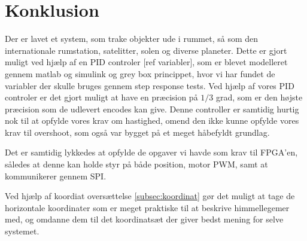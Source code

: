 \section{Konklusion}
Der er lavet et system, som trake objekter ude i rummet, så som den internationale rumstation, satelitter, solen og diverse planeter. Dette er gjort muligt ved hjælp af en PID controler [ref variabler], som er blevet modelleret gennem matlab og simulink og grey box princippet, hvor vi har fundet de variabler der skulle bruges gennem step response tests. Ved hjælp af vores PID controler er det gjort muligt at have en præcision på $1/3$ grad, som er den højste præcision som de udlevert encodes kan give. Denne controller er samtidig hurtig nok til at opfylde vores krav om hastighed, omend den ikke kunne opfylde vores krav til overshoot, som også var bygget på et meget håbefyldt grundlag.

Det er samtidig lykkedes at opfylde de opgaver vi havde som krav til FPGA'en, således at denne kan holde styr på både position, motor PWM, samt at kommunikerer gennem SPI.

Ved hjælp af koordiat oversættelse \ref{subsec:koordinat} gør det muligt at tage de horizontale koordinater som er meget praktiske til at beskrive himmellegemer med, og omdanne dem til det koordinatsæt der giver bedst mening for selve systemet.